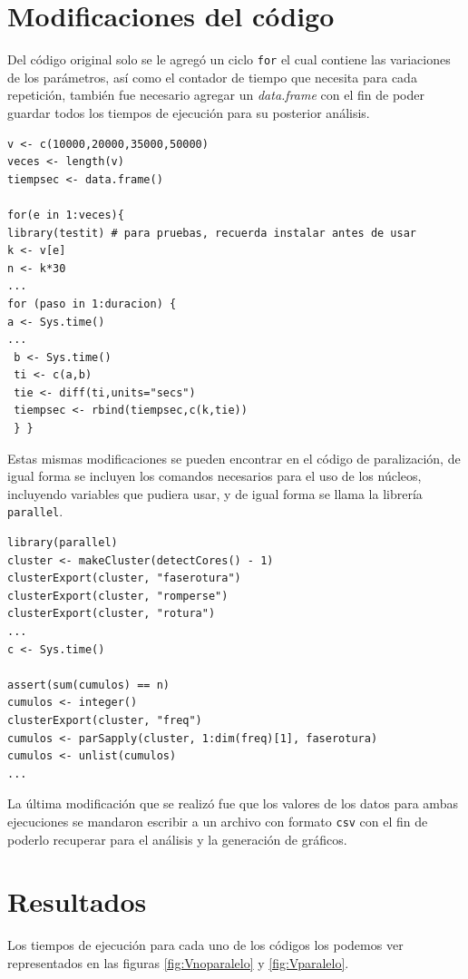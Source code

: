 \documentclass[a4paper]{article}
\begin{document}
\section{Modificaciones del código}
Del código original solo se le agregó un ciclo \texttt{for} el cual contiene las variaciones de los parámetros, así como el contador de tiempo que necesita para cada repetición, también fue necesario agregar un \textit{data.frame} con el fin de poder guardar todos los tiempos de ejecución para su posterior análisis.

\begin{lstlisting}[frame=single]
v <- c(10000,20000,35000,50000)
veces <- length(v)
tiempsec <- data.frame()

for(e in 1:veces){
library(testit) # para pruebas, recuerda instalar antes de usar
k <- v[e]
n <- k*30
...
for (paso in 1:duracion) {
a <- Sys.time()
...
 b <- Sys.time()
 ti <- c(a,b)
 tie <- diff(ti,units="secs")
 tiempsec <- rbind(tiempsec,c(k,tie))
 } }
\end{lstlisting}

Estas mismas modificaciones se pueden encontrar en el código de paralización, de igual forma se incluyen los comandos necesarios para el uso de los núcleos, incluyendo variables que pudiera usar, y de igual forma se llama la librería \texttt{parallel}.

\begin{lstlisting}[frame=single]
library(parallel)
cluster <- makeCluster(detectCores() - 1)
clusterExport(cluster, "faserotura")
clusterExport(cluster, "romperse")
clusterExport(cluster, "rotura")
...
c <- Sys.time()

assert(sum(cumulos) == n)
cumulos <- integer()
clusterExport(cluster, "freq")
cumulos <- parSapply(cluster, 1:dim(freq)[1], faserotura)
cumulos <- unlist(cumulos)
...
\end{lstlisting}

La última modificación que se realizó fue que los valores de los datos para ambas ejecuciones se mandaron escribir a un archivo con formato \texttt{csv} con el fin de poderlo recuperar para el análisis y la generación de gráficos.
\section{Resultados}
Los tiempos de ejecución para cada uno de los códigos los podemos ver representados en las figuras \ref{fig:Vnoparalelo} y \ref{fig:Vparalelo}.
\end{document}
